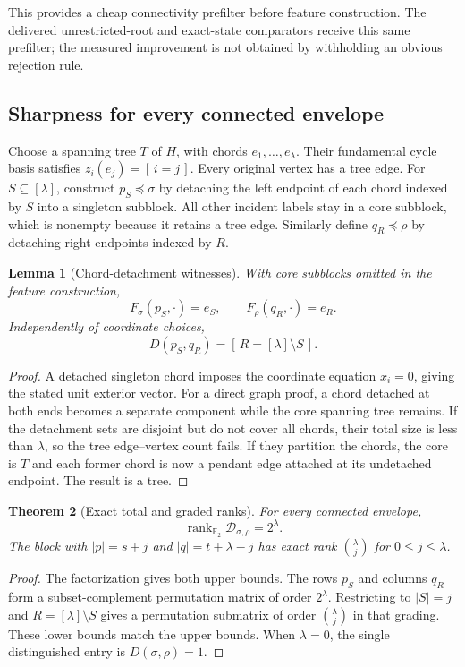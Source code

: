 \documentclass[11pt,a4paper]{article}
\newtheorem{theorem}{Theorem}[section]
\newtheorem{lemma}[theorem]{Lemma}
\theoremstyle{definition}
\theoremstyle{remark}
\newcommand{\F}{\mathbb F_2}
\newcommand{\rk}{\operatorname{rank}}
\newcommand{\ind}[1]{[\,#1\,]}
\begin{document}
This provides a cheap connectivity prefilter before feature construction. The delivered
unrestricted-root and exact-state comparators receive this same prefilter; the measured
improvement is not obtained by withholding an obvious rejection rule.

\subsection{Sharpness for every connected envelope}
Choose a spanning tree $T$ of $H$, with chords $e_1,\ldots,e_\lambda$. Their fundamental
cycle basis satisfies $z_i(e_j)=\ind{i=j}$. Every original vertex has a tree edge.
For $S\subseteq[\lambda]$, construct $p_S\preceq\sigma$ by detaching the left
endpoint of each chord indexed by $S$ into a singleton subblock. All other incident
labels stay in a core subblock, which is nonempty because it retains a tree edge.
Similarly define $q_R\preceq\rho$ by detaching right endpoints indexed by $R$.

\begin{lemma}[Chord-detachment witnesses]\label{lem:chord}
With core subblocks omitted in the feature construction,
\[
 F_\sigma(p_S,\cdot)=e_S,\qquad F_\rho(q_R,\cdot)=e_R.
\]
Independently of coordinate choices,
\begin{equation}
                      D(p_S,q_R)=\ind{R=[\lambda]\setminus S}.
 \label{eq:permutation}
\end{equation}
\end{lemma}
\begin{proof}
A detached singleton chord imposes the coordinate equation $x_i=0$, giving the stated
unit exterior vector. For a direct graph proof, a chord detached at both ends becomes
a separate component while the core spanning tree remains. If the detachment sets are
disjoint but do not cover all chords, their total size is less than $\lambda$, so the
tree edge--vertex count fails. If they partition the chords, the core is $T$ and each
former chord is now a pendant edge attached at its undetached endpoint. The result is
a tree.
\end{proof}

\begin{theorem}[Exact total and graded ranks]\label{thm:rank}
For every connected envelope,
\begin{equation}
                 \rk_{\F}\mathcal D_{\sigma,\rho}=2^\lambda.
 \label{eq:exactrank}
\end{equation}
The block with $|p|=s+j$ and $|q|=t+\lambda-j$ has exact rank
$\binom\lambda j$ for $0\le j\le\lambda$.
\end{theorem}
\begin{proof}
The factorization gives both upper bounds. The rows $p_S$ and columns $q_R$ form a
subset-complement permutation matrix of order $2^\lambda$. Restricting to $|S|=j$
and $R=[\lambda]\setminus S$ gives a permutation submatrix of order $\binom\lambda j$
in that grading. These lower bounds match the upper bounds. When $\lambda=0$, the
single distinguished entry is $D(\sigma,\rho)=1$.
\end{proof}
\end{document}
